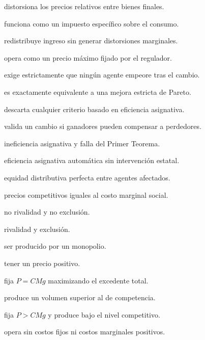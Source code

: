 \begin{opts}
    \item distorsiona los precios relativos entre bienes finales.
    \item funciona como un impuesto específico sobre el consumo.
    \item redistribuye ingreso sin generar distorsiones marginales.
    \item opera como un precio máximo fijado por el regulador.
\end{opts}

\begin{opts}
    \item exige estrictamente que ningún agente empeore tras el cambio.
    \item es exactamente equivalente a una mejora estricta de Pareto.
    \item descarta cualquier criterio basado en eficiencia asignativa.
    \item valida un cambio si ganadores pueden compensar a perdedores.
\end{opts}

\begin{opts}
    \item ineficiencia asignativa y falla del Primer Teorema.
    \item eficiencia asignativa automática sin intervención estatal.
    \item equidad distributiva perfecta entre agentes afectados.
    \item precios competitivos iguales al costo marginal social.
\end{opts}

\begin{opts}
    \item no rivalidad y no exclusión.
    \item rivalidad y exclusión.
    \item ser producido por un monopolio.
    \item tener un precio positivo.
\end{opts}

\begin{opts}
    \item fija $P=CMg$ maximizando el excedente total.
    \item produce un volumen superior al de competencia.
    \item fija $P>CMg$ y produce bajo el nivel competitivo.
    \item opera sin costos fijos ni costos marginales positivos.
\end{opts}

